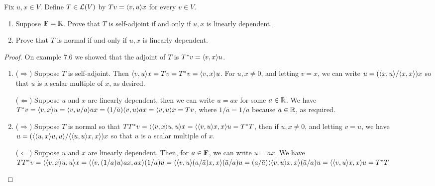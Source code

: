 \begin{exercise}{15}
  Fix $u,x\in V$. Define $T\in\mathcal{L}(V)$ by $Tv=\langle v,u\rangle x$ for every $v\in V$.
  \begin{enumerate}
      \item Suppose $\mathbf{F}=\mathbb{R}$. Prove that $T$ is self-adjoint if and only if $u, x$ is linearly dependent.
      \item Prove that $T$ is normal if and only if $u, x$ is linearly dependent.
  \end{enumerate}
\end{exercise}
\begin{proof}
On example 7.6 we showed that the adjoint of $T$ is $T^\ast v =\langle v,x\rangle u$.
 \begin{enumerate}
    \item ($\Rightarrow$) Suppose $T$ is self-adjoint. Then $\langle v,u\rangle x=Tv =T^\ast v =\langle v,x\rangle u$. For $u,x\neq 0$, and letting $v=x$, we can write $u=(\langle x,u\rangle/\langle x,x\rangle)x$ so that $u$ is a scalar multiple of $x$, as desired.
    
     ($\Leftarrow$) Suppose $u$ and $x$ are linearly dependent, then we can write $u=ax$ for some $a\in\mathbb{R}$. We have $T^\ast v =\langle v,x\rangle u =\langle v,u/a\rangle ax =(1/\bar{a})\langle v,u\rangle ax =\langle v,u\rangle x =Tv$, where $1/\bar{a}=1/a$ because $a\in\mathbb{R}$, as required.
     \item ($\Rightarrow$) Suppose $T$ is normal so that $TT^\ast v =\langle \langle v,x\rangle u, u\rangle x =\langle \langle v,u\rangle x, x\rangle u=T^\ast T$, then if $u,x\neq 0$, and letting $v=u$, we have $u =(\langle \langle u,x\rangle u, u\rangle/\langle \langle u,u\rangle x, x\rangle)x$ so that $u$ is a scalar multiple of $x$.
     
     ($\Leftarrow$) Suppose $u$ and $x$ are linearly dependent. Then, for $a\in\mathbf{F}$, we can write $u=ax$. We have $TT^\ast v =\langle \langle v,x\rangle u, u\rangle x =\langle \langle v,(1/a)u\rangle ax, ax\rangle(1/a)u =\langle \langle v,u\rangle(a/\bar{a})x, x\rangle(\bar{a}/a)u =(a/\bar{a})\langle \langle v,u\rangle x, x\rangle(\bar{a}/a)u =\langle \langle v,u\rangle x, x\rangle u=T^\ast T$
 \end{enumerate}
\end{proof}

